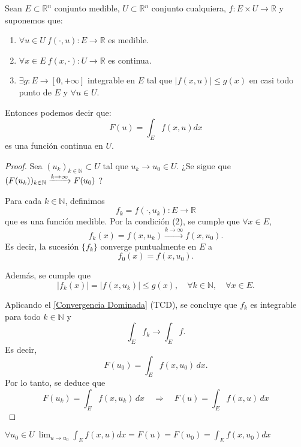 \begin{teorema}
    Sean $E \subset \mathbb{R}^n$ conjunto medible, $U \subset \mathbb{R}^n$ conjunto cualquiera, $f: E \times U \to \mathbb{R}$ y suponemos que:
    \vspace{-0.5em}
    \begin{enumerate}
        \item $\forall u \in U \ f(\cdot, u): E \to \mathbb{R}$ es medible.
        \item $\forall x \in E \ f(x, \cdot): U \to \mathbb{R}$ es continua.
        \item $\exists g: E \to [0, +\infty]$ integrable en $E$ tal que $|f(x, u)| \leq g(x)$ en casi todo punto de $E$ y $\forall u \in U$.
    \end{enumerate}
    Entonces podemos decir que:
    $$ F(u) = \int_{E}f(x, u)dx $$ es una función continua en $U$.
\end{teorema}
\begin{proof}
    Sea \( ( u_k )_{k \in \mathbb{N}} \subset U \) tal que \( u_k \to u_0 \in U \).
    ¿Se sigue que \( ( F(u_k) )_{k \in \mathbb{N}} \xrightarrow{k \to \infty} F(u_0) \) ?

    Para cada \( k \in \mathbb{N} \), definimos
    \[
        f_k = f(\cdot, u_k): E \to \mathbb{R}
    \]
    que es una función medible. Por la condición (2), se cumple que \( \forall x
    \in E \),
    \[
        f_k(x) = f(x, u_k) \xrightarrow{k \to \infty} f(x, u_0).
    \]
    Es decir, la sucesión \( \{ f_k \} \) converge puntualmente en \( E \) a
    \[
        f_0(x) = f(x, u_0).
    \]

    Además, se cumple que
    \[
        |f_k(x)| = |f(x, u_k)| \leq g(x), \quad \forall k \in \mathbb{N}, \quad \forall x \in E.
    \]

    Aplicando el \cref{Convergencia Dominada} (TCD), se concluye que \( f_k \) es
    integrable para todo \( k \in \mathbb{N} \) y
    \[
        \int_E f_k \to \int_E f.
    \]
    Es decir,
    \[
        F(u_0) = \int_E f(x, u_0) \,dx.
    \]
    Por lo tanto, se deduce que
    \[
        F(u_k) = \int_E f(x, u_k) \,dx \quad \Rightarrow \quad F(u) = \int_E f(x, u) \,dx
    \]
\end{proof}
\begin{observación}
$\forall u_0 \in U \ \lim_{u \to u_0} \int_{E}f(x, u)dx = F(u) = F(u_0) = \int_{E}f(x, u_0)dx$
\end{observación}

